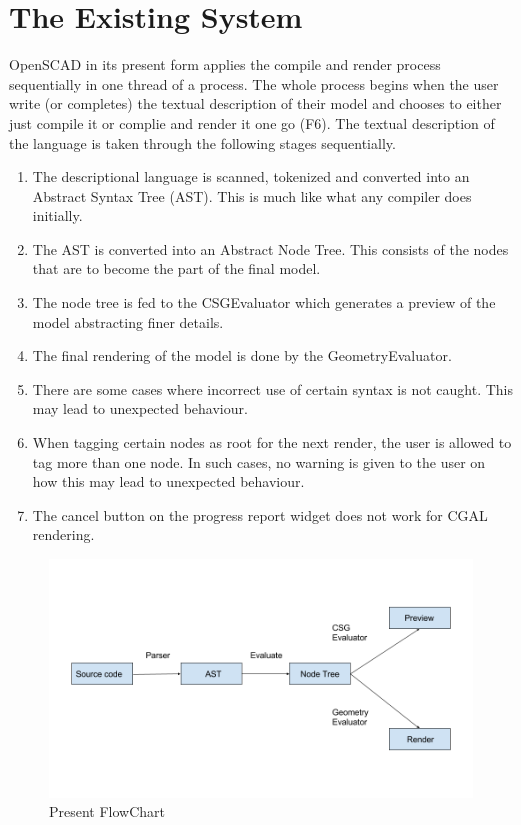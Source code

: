 \section{The Existing System}
OpenSCAD in its present form applies the compile and render process sequentially in one thread of a process. The whole process begins when the user write (or completes) the textual description of their model and chooses to either just compile it or complie and render it one go (F6). The textual description of the language is taken through the following stages sequentially.
\begin{enumerate}
	\item The descriptional language is scanned, tokenized and converted into an Abstract Syntax Tree (AST). This is much like what any compiler does initially.
	\item The AST is converted into an Abstract Node Tree. This consists of the nodes that are to become the part of the final model.
	\item The node tree is fed to the CSGEvaluator which generates a preview of the model abstracting finer details.
	\item The final rendering of the model is done by the GeometryEvaluator.
	\item There are some cases where incorrect use of certain syntax is not caught. This may lead to unexpected behaviour.
	\item When tagging certain nodes as root for the next render, the user is allowed to tag more than one node. In such cases, no warning is given to the user on how this may lead to unexpected behaviour.
	\item The cancel button on the progress report widget does not work for CGAL rendering.
\end{enumerate}

\begin{figure}[H]
\centering
\includegraphics[width=\linewidth]{images/flowchart}
\caption{Present FlowChart}
\label{fig:flowchart}
\end{figure}

